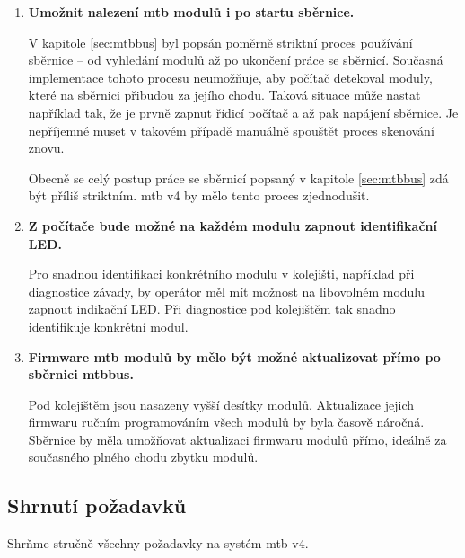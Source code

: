 \begin{enumerate}
\item \textbf{Umožnit nalezení \gls{mtb} modulů i po startu sběrnice.}

	V kapitole \ref{sec:mtbbus} byl popsán poměrně striktní proces používání
	sběrnice – od vyhledání modulů až po ukončení práce se sběrnicí. Současná
	implementace tohoto procesu neumožňuje, aby počítač detekoval moduly, které
	na sběrnici přibudou za jejího chodu. Taková situace může nastat například
	tak, že je prvně zapnut řídicí počítač a až pak napájení sběrnice. Je
	nepříjemné muset v takovém případě manuálně spouštět proces skenování
	znovu.

	Obecně se celý postup práce se sběrnicí popsaný v kapitole \ref{sec:mtbbus}
	zdá být příliš striktním. \gls{mtb} v4 by mělo tento proces zjednodušit.

\item \textbf{Z počítače bude možné na každém modulu zapnout identifikační LED.}

	Pro snadnou identifikaci konkrétního modulu v kolejišti, například při
	diagnostice závady, by operátor měl mít možnost na libovolném modulu
	zapnout indikační LED. Při diagnostice pod kolejištěm tak snadno identifikuje
	konkrétní modul.

\item \textbf{Firmware \gls{mtb} modulů by mělo být možné aktualizovat přímo
	po sběrnici \gls{mtbbus}.}

	Pod kolejištěm jsou nasazeny vyšší desítky modulů. Aktualizace jejich
	firmwaru ručním programováním všech modulů by byla časově náročná. Sběrnice
	by měla umožňovat aktualizaci firmwaru modulů přímo, ideálně za současného
	plného chodu zbytku modulů.

\end{enumerate}

\subsection{Shrnutí požadavků}

Shrňme stručně všechny požadavky na systém \gls{mtb} v4.


